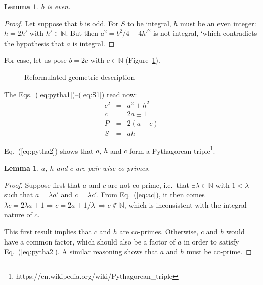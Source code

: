 \documentclass[11pt, twoside, a4paper]{article}
\newtheorem{lemma}[theorem]{Lemma}
\newcommand{\Figure}[1]{Figure~\ref{#1}}
\newcommand{\Eq}[1]{Eq.~(\ref{#1})}
\newcommand{\Eqs}[2]{Eqs.~(\ref{#1})--(\ref{#2})}
\newcommand{\set}[1]{\mathbb{#1}}
\begin{document}
\begin{lemma}$b$ is even.\end{lemma}
\begin{proof} Let suppose that $b$ is odd. For $S$ to be integral, $h$ must be an even integer: $h=2h'$ with $h'\in\set N$. But then $a^2 = b^2/4 + 4h'^2$ is not integral, `which contradicts the hypothesis that $a$ is integral.
\end{proof}

For ease, let us pose $b=2c$ with $c\in\set N$ (\Figure{fig:triangle2}). 
\begin{figure}
    \begin{center}
        \caption{Reformulated geometric description}
        \label{fig:triangle2}
    \end{center}
\end{figure}

The \Eqs{eq:pytha1}{eq:S1} read now:
\begin{eqnarray}
c^2 & = & a^2 + h^2 \\ \label{eq:pytha2}
  c & = & 2a \pm 1 \\ \label{eq:ac}
  P & = & 2(a+c) \\ 
  S & = & ah \label{eq:S2}
\end{eqnarray}

\Eq{eq:pytha2} shows that $a$, $h$ and $c$ form a Pythagorean triple\footnote{https://en.wikipedia.org/wiki/Pythagorean\_triple}.

\begin{lemma}
	$a$, $h$ and $c$ are pair-wise co-primes. 
\end{lemma}

\begin{proof} 
	Suppose first that $a$ and $c$ are not co-prime, i.e.\ that $\exists\lambda\in\set N$ with $1<\lambda$ such that $a=\lambda a'$ and $c=\lambda c'$. From \Eq{eq:ac}, it then comes $\lambda c = 2 \lambda a \pm 1 \Rightarrow c = 2 a \pm 1/\lambda\ \Rightarrow c \not\in\set N$, which is inconsistent with the integral nature of $c$.
	
	This first result implies that $c$ and $h$ are co-primes. Otherwise, $c$ and $h$ would have a common factor, which should also be a factor of $a$ in order to satisfy \Eq{eq:pytha2}. A similar reasoning shows that $a$ and $h$ must be co-prime.
\end{proof}
\end{document}
